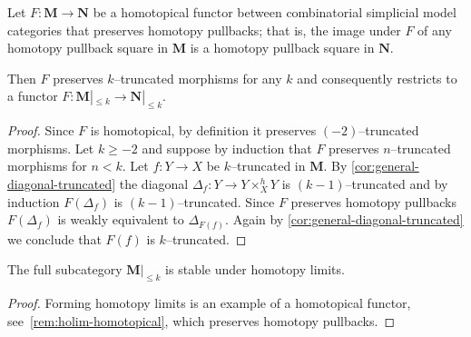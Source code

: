 \begin{proposition}\label{prop:truncated-objects-exact-functors}
  Let \(F\colon \mathbf{M}\to\mathbf{N}\) be a homotopical functor
  between combinatorial simplicial model categories that preserves
  homotopy pullbacks; that is, the image under \(F\) of any homotopy
  pullback square in \(\mathbf M\) is a homotopy pullback square in
  \(\mathbf N\).

  Then \(F\) preserves \(k\)--truncated morphisms for any \(k\) and
  consequently restricts to a functor
  \(F\colon \mathbf M|_{\leq k}\to\mathbf N|_{\leq k}\).
\end{proposition}
\begin{proof}
  Since \(F\) is homotopical, by definition it preserves
  \((-2)\)--truncated morphisms. Let \(k\geq -2\) and suppose by
  induction that \(F\) preserves \(n\)--truncated morphisms for
  \(n<k\). Let \(f\colon Y\to X\) be \(k\)--truncated in \(\mathbf
  M\). By \autoref{cor:general-diagonal-truncated} the diagonal
  \(\Delta_{f}\colon Y\to Y\times^{h}_{X} Y\) is \((k-1)\)--truncated
  and by induction \(F(\Delta_{f})\) is \((k-1)\)--truncated. Since
  \(F\) preserves homotopy pullbacks \(F(\Delta_{f})\) is weakly
  equivalent to \(\Delta_{F(f)}\). Again by
  \autoref{cor:general-diagonal-truncated} we conclude that \(F(f)\)
  is \(k\)--truncated.
\end{proof}

\begin{corollary}\label{cor:truncated-objects-limits}
  The full subcategory \(\mathbf{M}|_{{\leq} k}\) is stable under
  homotopy limits.
\end{corollary}
\begin{proof}
  Forming homotopy limits is an example of a homotopical functor, see~\autoref{rem:holim-homotopical}, which preserves homotopy pullbacks.
\end{proof}

